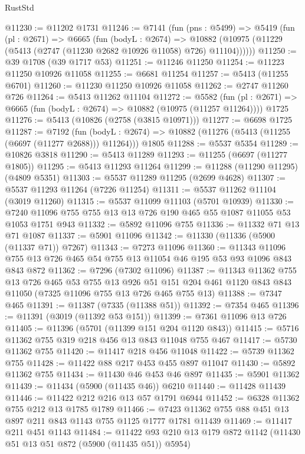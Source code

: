 \begin{lexlean}{RustStd}
\begin{coremodule}
@11230 := @11202 @1731
@11246 := @7141
    (fun (pns : @5499) =>
    @5419
      (fun (pl : @2671) =>
      @6665
        (fun (bodyL : @2674) =>
        @10882 (@10975 (@11229 (@5413 (@2747 (@11230 @2682 @10926 @11058) @726) @11104))))))
@11250 := @39 @1708 (@39 @1717 @53)
@11251 := @11246 @11250
@11254 := @11223 @11250 @10926 @11058
@11255 := @6681 @11254
@11257 := @5413 (@11255 @6701)
@11260 := @11230 @11250 @10926 @11058
@11262 := @2747 @11260 @726
@11264 := @5413 @11262 @11104
@11272 := @5582
    (fun (pl : @2671) => @6665 (fun (bodyL : @2674) => @10882 (@10975 (@11257 @11264))))
    @1725
@11276 := @5413 (@10826 (@2758 (@3815 @10971)))
@11277 := @6698 @1725
@11287 := @7192
    (fun (bodyL : @2674) => @10882 (@11276 (@5413 (@11255 (@6697 (@11277 @2688))) @11264)))
    @1805
@11288 := @5537 @5354
@11289 := @10826 @3818
@11290 := @5413 @11289
@11293 := @11255 (@6697 (@11277 @1805))
@11295 := @5413 @11293 @11264
@11299 := @11288 (@11290 @11295) (@4809 @5351)
@11303 := @5537 @11289 @11295 (@2699 @4628)
@11307 := @5537 @11293 @11264 (@7226 @11254)
@11311 := @5537 @11262 @11104 (@3019 @11260)
@11315 := @5537 @11099 @11103 (@5701 @10939)
@11330 := @7240 @11096 @755 @755 @13 @13 @726 @190 @465 @55 @1087 @11055 @53 @1053 @1751 @943
@11332 := @5892 @11096 @755
@11336 := @11332 @71 @13 @71 @1087
@11337 := @5901 @11096
@11342 := @11330 (@11336 (@5900 (@11337 @71)) @7267)
@11343 := @7273 @11096
@11360 := @11343 @11096 @755 @13 @726 @465 @54 @755 @13 @11054 @46 @195 @53 @93 @1096 @843 @843 @872
@11362 := @7296 (@7302 @11096)
@11387 := @11343
    @11362
    @755
    @13
    @726
    @465
    @53
    @755
    @13
    @926
    @51
    @151
    @204
    @461
    @1120
    @843
    @843
    @11050
    (@7325 @11096 @755 @13 @726 @465 @755 @13)
@11388 := @7347 @465
@11391 := @11387 (@7335 (@11388 @51))
@11392 := @7354 @465
@11396 := @11391 (@3019 (@11392 @53 @151))
@11399 := @7361 @11096 @13 @726
@11405 := @11396 (@5701 (@11399 @151 @204 @1120 @843))
@11415 := @5716 @11362 @755 @319 @218 @456 @13 @843 @11048 @755 @467
@11417 := @5730 @11362 @755
@11420 := @11417 @218 @456 @11048
@11422 := @5739 @11362 @755
@11428 := @11422 @88 @217 @453 @455 @897 @11047
@11430 := @5892 @11362 @755
@11434 := @11430 @46 @453 @46 @897
@11435 := @5901 @11362
@11439 := @11434 (@5900 (@11435 @46)) @6210
@11440 := @11428 @11439
@11446 := @11422 @212 @216 @13 @57 @1791 @6944
@11452 := @6328 @11362 @755 @212 @13 @1785 @1789
@11466 := @7423 @11362 @755 @88 @451 @13 @897 @211 @843 @1143 @755 @1125 @1777 @1781 @11439
@11469 := @11417 @211 @451 @1143
@11484 := @11422 @93 @210 @13 @179 @872 @1142 (@11430 @51 @13 @51 @872 (@5900 (@11435 @51)) @5954)

\end{coremodule}
\end{lexlean}

